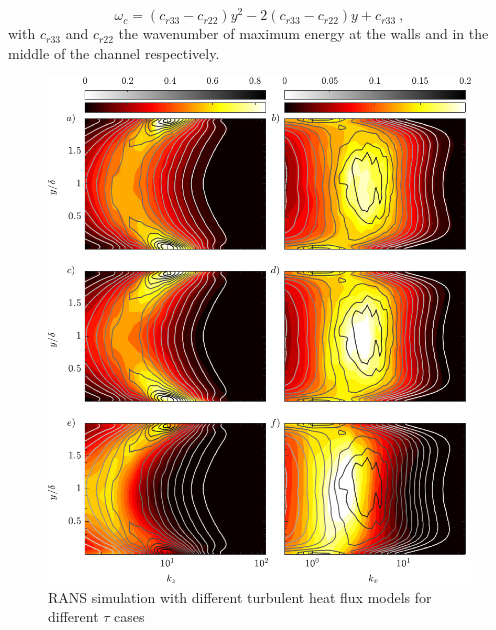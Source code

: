 \documentclass[10pt]{article}
\begin{document}
\begin{equation*}
\omega_c = (c_{r33} - c_{r22}) y^2 - 2(c_{r33} - c_{r22})y +c_{r33} \ ,
\end{equation*}
with $c_{r33}$ and $c_{r22}$ the wavenumber of maximum energy at the walls and in the middle of the channel respectively. 

\begin{figure}[h]
\centering
\includegraphics[width=1.1\textwidth]{fig13.pdf}
\caption{\noindent RANS simulation with different turbulent heat flux models for different $\tau$ cases}
\label{spectra}
\end{figure}
\newpage
\end{document}
